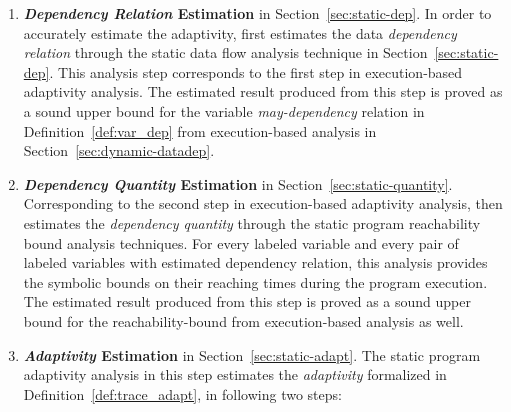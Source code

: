 \begin{enumerate}
  \item \textbf{\emph{Dependency Relation} Estimation} in Section~\ref{sec:static-dep}.
  In order to accurately estimate the adaptivity,  {\THESYSTEM} first estimates
  the data \emph{dependency relation} through the static data flow analysis technique in Section~\ref{sec:static-dep}.
  This analysis step corresponds to the first step in execution-based adaptivity analysis. 
  The estimated result produced from 
  this step is proved as a sound upper bound for the variable \emph{may-dependency} relation in Definition~\ref{def:var_dep} from execution-based analysis in Section~\ref{sec:dynamic-datadep}.
  \item \textbf{\emph{Dependency Quantity} Estimation} in Section~\ref{sec:static-quantity}.
  Corresponding to the second step in execution-based adaptivity analysis, {\THESYSTEM} then estimates the \emph{dependency quantity} 
  through the static program reachability bound analysis techniques.
  For every labeled variable and every pair of labeled variables with estimated dependency relation, this analysis provides the symbolic
 bounds on their reaching times during the program execution.
  The estimated result produced from 
  this step is proved as a sound upper bound for the reachability-bound from execution-based analysis as well.
  \item \textbf{\emph{Adaptivity} Estimation} in Section~\ref{sec:static-adapt}.
  The static program adaptivity analysis in this step
  estimates the \emph{adaptivity} formalized in Definition~\ref{def:trace_adapt}, in following two steps:
  \begin{itemize}

\end{itemize}
\end{enumerate}
